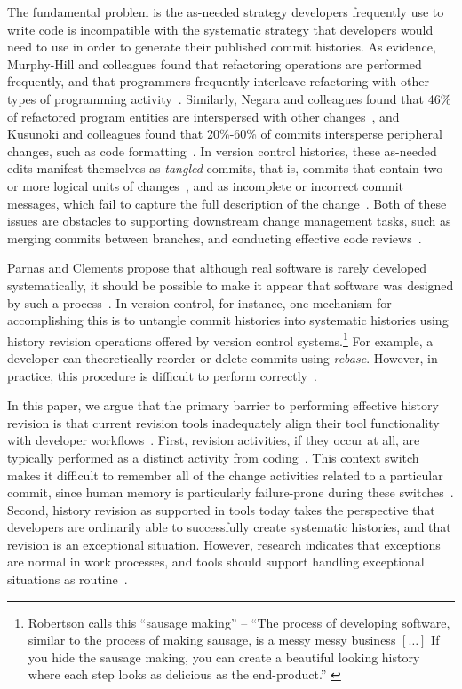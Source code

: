 \documentclass[conference]{IEEEtran}
\newcommand{\purpose}[1]{}
\begin{document}
\purpose{Problem is that strategies are incompatible.} 
The fundamental problem is the as-needed strategy developers frequently use to write code is incompatible with 
the systematic strategy that developers would need to use in order to generate their published commit histories. 
As evidence, Murphy-Hill and colleagues found that refactoring operations are performed frequently, and that programmers 
frequently interleave refactoring with other types of programming activity~\cite{Murphy-Hill2012c}. 
%
Similarly, Negara and colleagues found that 46\% of refactored program entities are interspersed with other changes~\cite{Negara2012}, and Kusunoki and colleagues found that 20\%-60\% of commits intersperse peripheral changes, such as code formatting~\cite{Kusunoki2013}.
% 
In version control histories, these as-needed edits manifest themselves as \emph{tangled} commits, that is, commits that contain two or more logical units of changes~\cite{Kirinuki2014}, and as incomplete or incorrect commit messages, which fail to capture the full description of the change~\cite{Buse2010,Murphy-Hill2012c}. 
Both of these issues are obstacles to supporting downstream change management tasks, such as merging commits between branches, and conducting effective code reviews~\cite{Kirinuki2014}.

\purpose{History revision gets out of this conflict} 
Parnas and Clements propose that although real software is rarely developed systematically, it should be possible to make it appear that software was designed by such a process~\cite{Parnas1986}. In version control, for instance, one mechanism for accomplishing this is to untangle commit histories into systematic histories using history revision operations offered by version control systems.\footnote{Robertson calls this ``sausage making'' -- ``The process of developing software, 
similar to the process of making sausage, is a messy messy business $[\ldots]$ If you hide the sausage making, 
you can create a beautiful looking history where each step looks as delicious as the end-product.'' 
\cite{SausageMaking}}
For example, a developer can theoretically reorder or delete commits using \textit{rebase}.
However, in practice, this procedure is difficult to perform correctly~\cite{SausageMaking}.

\purpose{History revisions are not properly supported by tools} 
In this paper, we argue that the primary barrier to performing effective history revision is that current revision tools inadequately align their tool 
functionality with developer workflows~\cite{PerezDeRosso2013}.
First, revision activities, if they occur at all, are typically performed as a distinct activity from coding~\cite{Perry1989}. 
This context switch makes it difficult to remember all of the change activities related to a particular commit, 
since human memory is particularly failure-prone during these switches~\cite{Parnin2012}. 
Second, history revision as supported in tools today takes the perspective that 
developers are ordinarily able to successfully create systematic histories, and that revision is an exceptional situation. However, research indicates that exceptions are normal in work processes, and tools should support handling 
exceptional situations as routine~\cite{Ackerman2000}.
\end{document}
